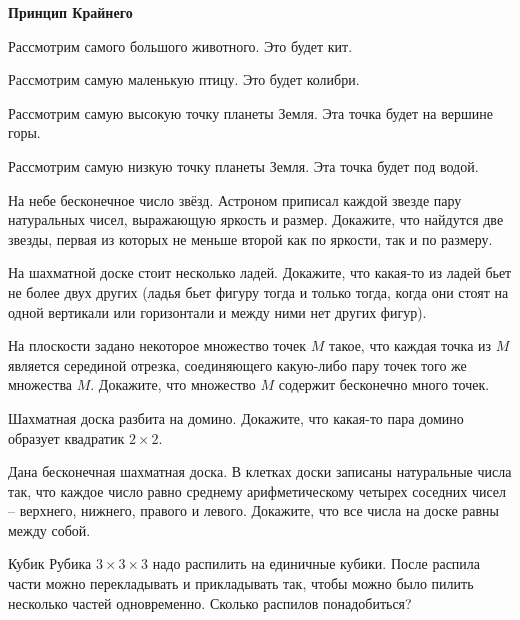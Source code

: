 \documentclass{article}
\begin{document}
    \large

    \begin{center}
        \textbf{Принцип Крайнего}
    \end{center}

    Рассмотрим самого большого животного.
    Это будет кит.

    Рассмотрим самую маленькую птицу.
    Это будет колибри.

    Рассмотрим самую высокую точку планеты Земля.
    Эта точка будет на вершине горы.

    Рассмотрим самую низкую точку планеты Земля.
    Эта точка будет под водой.

    \begin{enumerate_boxed}

        \item На небе бесконечное число звёзд.
        Астроном приписал каждой звезде пару натуральных чисел, выражающую яркость и размер.
        Докажите, что найдутся две звезды, первая из которых не меньше второй как по яркости, так и по размеру.

        \item На шахматной доске стоит несколько ладей.
        Докажите, что какая-то из ладей бьет не более двух других (ладья бьет фигуру тогда и только тогда, когда они стоят на одной вертикали или горизонтали и между ними нет других фигур).

        \item На плоскости задано некоторое множество точек $M$ такое, что каждая точка из $M$ является серединой отрезка, соединяющего какую-либо пару точек того же множества $M$.
        Докажите, что множество $M$ содержит бесконечно много точек.

        \item Шахматная доска разбита на домино.
        Докажите, что какая-то пара домино образует квадратик $2\times 2$.

        \item Дана бесконечная шахматная доска.
        В клетках доски записаны натуральные числа так, что каждое число равно среднему арифметическому четырех соседних чисел – верхнего, нижнего, правого и левого.
        Докажите, что все числа на доске равны между собой.

        \item Кубик Рубика $3\times 3 \times 3$ надо распилить на единичные кубики.
        После распила части можно перекладывать и прикладывать так, чтобы можно было пилить несколько частей одновременно.
        Сколько распилов понадобиться?


\end{enumerate_boxed}
\end{document}
